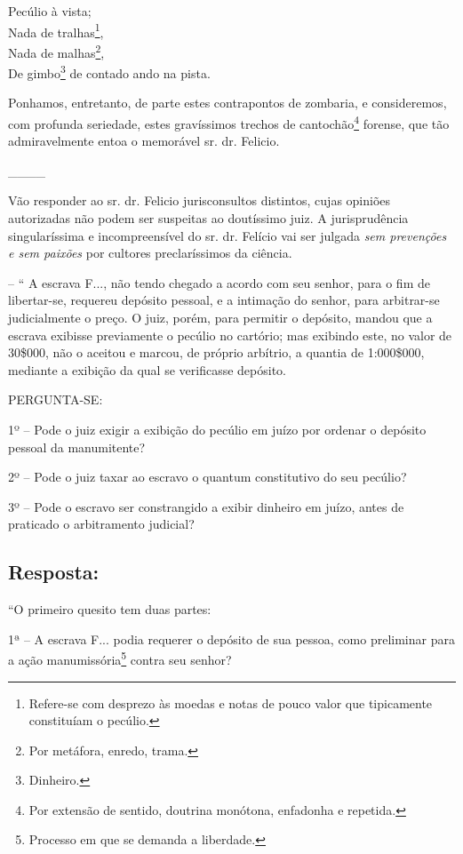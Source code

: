 Pecúlio à vista;\\
Nada de tralhas\footnote{ Refere-se com desprezo às moedas e notas de
  pouco valor que tipicamente constituíam o pecúlio.},\\
Nada de malhas\footnote{ Por metáfora, enredo, trama.},\\
De gimbo\footnote{ Dinheiro.} de contado ando na pista.

Ponhamos, entretanto, de parte estes contrapontos de zombaria, e
consideremos, com profunda seriedade, estes gravíssimos trechos de
cantochão\footnote{ Por extensão de sentido, doutrina monótona,
  enfadonha e repetida.} forense, que tão admiravelmente entoa o
memorável sr. dr. Felicio.

\_\_\_\_

Vão responder ao sr. dr. Felicio jurisconsultos distintos, cujas
opiniões autorizadas não podem ser suspeitas ao doutíssimo juiz. A
jurisprudência singularíssima e incompreensível do sr. dr. Felício vai
ser julgada \emph{sem prevenções e sem paixões} por cultores
preclaríssimos da ciência.

-- `` A escrava F..., não tendo chegado a acordo com seu senhor, para o
fim de libertar-se, requereu depósito pessoal, e a intimação do senhor,
para arbitrar-se judicialmente o preço. O juiz, porém, para permitir o
depósito, mandou que a escrava exibisse previamente o pecúlio no
cartório; mas exibindo este, no valor de 30\$000, não o aceitou e
marcou, de próprio arbítrio, a quantia de 1:000\$000, mediante a
exibição da qual se verificasse depósito.

PERGUNTA-SE:

1º -- Pode o juiz exigir a exibição do pecúlio em juízo por ordenar o
depósito pessoal da manumitente?

2º -- Pode o juiz taxar ao escravo o quantum constitutivo do seu
pecúlio?

3º -- Pode o escravo ser constrangido a exibir dinheiro em juízo, antes
de praticado o arbitramento judicial?

\subsection{Resposta:}

``O primeiro quesito tem duas partes:

1ª -- A escrava F... podia requerer o depósito de sua pessoa, como
preliminar para a ação manumissória\footnote{ Processo em que se
  demanda a liberdade.} contra seu senhor?

